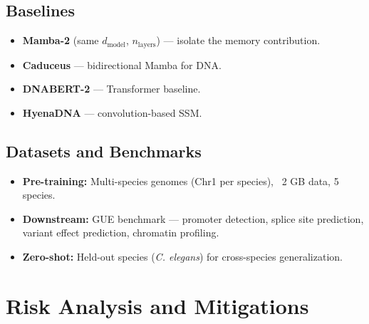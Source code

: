 \documentclass[11pt,a4paper]{article}
\numberwithin{equation}{section}
\begin{document}
\subsection{Baselines}

\begin{itemize}
    \item \textbf{Mamba-2} (same $d_{\text{model}}$, $n_{\text{layers}}$) --- isolate
    the memory contribution.
    \item \textbf{Caduceus} --- bidirectional Mamba for DNA.
    \item \textbf{DNABERT-2} --- Transformer baseline.
    \item \textbf{HyenaDNA} --- convolution-based SSM.
\end{itemize}

\subsection{Datasets and Benchmarks}

\begin{itemize}
    \item \textbf{Pre-training:} Multi-species genomes (Chr1 per species), ~2 GB data,
    5 species.
    \item \textbf{Downstream:} GUE benchmark \cite{luo2024gue} --- promoter detection,
    splice site prediction, variant effect prediction, chromatin profiling.
    \item \textbf{Zero-shot:} Held-out species (\emph{C. elegans}) for cross-species
    generalization.
\end{itemize}

\section{Risk Analysis and Mitigations}
\label{sec:risks}
\end{document}
